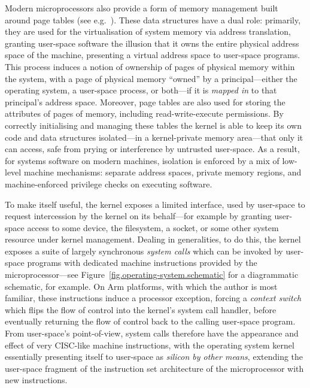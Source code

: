 \documentclass[a4paper, UKenglish, cleveref, autoref, thm-restate, colorlinks]{lipics-v2021}
\begin{document}
Modern microprocessors also provide a form of memory management built around page tables (see e.g.~\cite{arm-vmsa}).
These data structures have a dual role: primarily, they are used for the virtualisation of system memory via address translation, granting user-space software the illusion that it owns the entire physical address space of the machine, presenting a virtual address space to user-space programs.
This process induces a notion of ownership of pages of physical memory within the system, with a page of physical memory ``owned'' by a principal---either the operating system, a user-space process, or both---if it is \emph{mapped in} to that principal's address space.
Moreover, page tables are also used for storing the attributes of pages of memory, including read-write-execute permissions.
By correctly initialising and managing these tables the kernel is able to keep its own code and data structures isolated---in a kernel-private memory area---that only it can access, safe from prying or interference by untrusted user-space.
As a result, for systems software on modern machines, isolation is enforced by a mix of low-level machine mechanisms: separate address spaces, private memory regions, and machine-enforced privilege checks on executing software.

To make itself useful, the kernel exposes a limited interface, used by user-space to request intercession by the kernel on its behalf---for example by granting user-space access to some device, the filesystem, a socket, or some other system resource under kernel management.
Dealing in generalities, to do this, the kernel exposes a suite of largely synchronous \emph{system calls} which can be invoked by user-space programs with dedicated machine instructions provided by the microprocessor---see Figure~\ref{fig.operating-system.schematic} for a diagrammatic schematic, for example.
On Arm platforms, with which the author is most familiar, these instructions induce a processor exception, forcing a \emph{context switch} which flips the flow of control into the kernel's system call handler, before eventually returning the flow of control back to the calling user-space program.
From user-space's point-of-view, system calls therefore have the appearance and effect of very CISC-like machine instructions, with the operating system kernel essentially presenting itself to user-space as \emph{silicon by other means}, extending the user-space fragment of the instruction set architecture of the microprocessor with new instructions.
\end{document}
